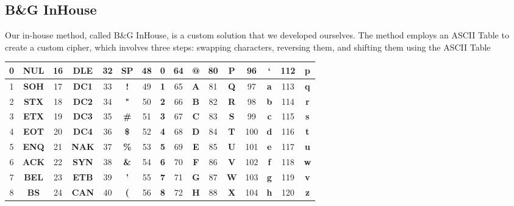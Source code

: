 \subsection{B\&G InHouse}

Our in-house method, called B\&G InHouse, is a custom solution that we developed ourselves. The method employs an ASCII Table to create a custom cipher, which involves three steps: swapping characters, reversing them, and shifting them using the ASCII Table

\begin{table}[hbt!]
\begin{tabular}{|c|c|c|c|c|c|c|c|c|c|c|c|c|c|c|c|}
\hline
0  & \textbf{NUL} & 16 & \textbf{DLE} & 32 & \textbf{SP} & 48 & \textbf{0}              & 64 & \textbf{@} & 80 & \textbf{P}                  & 96  & \textbf{`} & 112 & \textbf{p}      \\ \hline
1  & \textbf{SOH} & 17 & \textbf{DC1} & 33 & \textbf{!}  & 49 & \textbf{1}              & 65 & \textbf{A} & 81 & \textbf{Q}                  & 97  & \textbf{a} & 113 & \textbf{q}      \\ \hline
2  & \textbf{STX} & 18 & \textbf{DC2} & 34 & \textbf{"}  & 50 & \textbf{2}              & 66 & \textbf{B} & 82 & \textbf{R}                  & 98  & \textbf{b} & 114 & \textbf{r}      \\ \hline
3  & \textbf{ETX} & 19 & \textbf{DC3} & 35 & \textbf{\#} & 51 & \textbf{3}              & 67 & \textbf{C} & 83 & \textbf{S}                  & 99  & \textbf{c} & 115 & \textbf{s}      \\ \hline
4  & \textbf{EOT} & 20 & \textbf{DC4} & 36 & \textbf{\$} & 52 & \textbf{4}              & 68 & \textbf{D} & 84 & \textbf{T}                  & 100 & \textbf{d} & 116 & \textbf{t}      \\ \hline
5  & \textbf{ENQ} & 21 & \textbf{NAK} & 37 & \textbf{\%} & 53 & \textbf{5}              & 69 & \textbf{E} & 85 & \textbf{U}                  & 101 & \textbf{e} & 117 & \textbf{u}      \\ \hline
6  & \textbf{ACK} & 22 & \textbf{SYN} & 38 & \textbf{\&} & 54 & \textbf{6}              & 70 & \textbf{F} & 86 & \textbf{V}                  & 102 & \textbf{f} & 118 & \textbf{w}      \\ \hline
7  & \textbf{BEL} & 23 & \textbf{ETB} & 39 & \textbf{'}  & 55 & \textbf{7}              & 71 & \textbf{G} & 87 & \textbf{W}                  & 103 & \textbf{g} & 119 & \textbf{v}      \\ \hline
8  & \textbf{BS}  & 24 & \textbf{CAN} & 40 & \textbf{(}  & 56 & \textbf{8}              & 72 & \textbf{H} & 88 & \textbf{X}                  & 104 & \textbf{h} & 120 & \textbf{z}      \\ \hline

\end{tabular}
\end{table}
